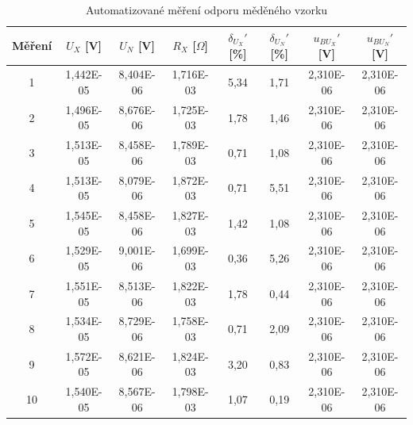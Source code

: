 \documentclass[a4paper, czech]{article}
\begin{document}
\begin{table}[H]
    \centering
    \caption{Automatizované měření odporu měděného vzorku}
    \begin{tabular}{>{\columncolor{orange!20}}c>{\columncolor{orange!20}}c>{\columncolor{orange!20}}c>{\columncolor{orange!20}}ccccc}
        \hline
        \rowcolor{yellow} Měření & $U_X$ {[}V{]} & $U_N$ {[}V{]} & $R_X$ {[}$\Omega${]} & $\delta_{U_X}'$ {[}\%{]} & $\delta_{U_N}'$ {[}\%{]} & $u_{BU_X}'$ {[}V{]} & $u_{BU_N}'$ {[}V{]} \\
        \hline
        1  & 1,442E-05 & 8,404E-06 & 1,716E-03 & 5,34 & 1,71 & 2,310E-06 & 2,310E-06 \\
        2  & 1,496E-05 & 8,676E-06 & 1,725E-03 & 1,78 & 1,46 & 2,310E-06 & 2,310E-06 \\
        3  & 1,513E-05 & 8,458E-06 & 1,789E-03 & 0,71 & 1,08 & 2,310E-06 & 2,310E-06 \\
        4  & 1,513E-05 & 8,079E-06 & 1,872E-03 & 0,71 & 5,51 & 2,310E-06 & 2,310E-06 \\
        5  & 1,545E-05 & 8,458E-06 & 1,827E-03 & 1,42 & 1,08 & 2,310E-06 & 2,310E-06 \\
        6  & 1,529E-05 & 9,001E-06 & 1,699E-03 & 0,36 & 5,26 & 2,310E-06 & 2,310E-06 \\
        7  & 1,551E-05 & 8,513E-06 & 1,822E-03 & 1,78 & 0,44 & 2,310E-06 & 2,310E-06 \\
        8  & 1,534E-05 & 8,729E-06 & 1,758E-03 & 0,71 & 2,09 & 2,310E-06 & 2,310E-06 \\
        9  & 1,572E-05 & 8,621E-06 & 1,824E-03 & 3,20 & 0,83 & 2,310E-06 & 2,310E-06 \\
        10 & 1,540E-05 & 8,567E-06 & 1,798E-03 & 1,07 & 0,19 & 2,310E-06 & 2,310E-06 \\
        \hline
    \end{tabular}


\end{table}
\end{document}

